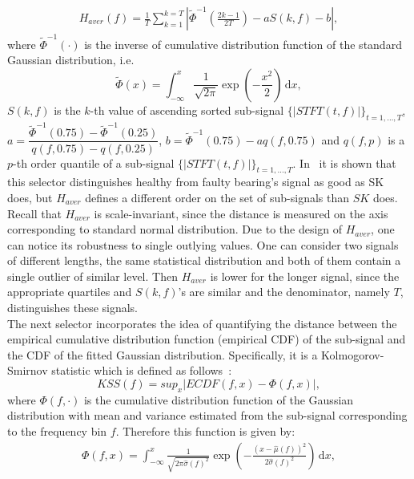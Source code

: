 \begin{eqnarray}
H_{aver}(f)=\frac{1}{T}\sum_{k=1}^{k=T}{ \left| \widetilde{\Phi}^{-1}\left(\frac{2k-1}{2T} \right) - a S(k,f)-b \right| },
\end{eqnarray}
where $\widetilde{\Phi}^{-1}(\cdot)$ is the inverse of cumulative distribution function of the standard Gaussian distribution, i.e. $$\widetilde{\Phi}(x)=\int^{x}_{-\infty} \! \frac{1}{\sqrt{2\pi}}\exp \left( -\frac{x^2}{2} \right) \, \mathrm{d} x,$$ $S(k,f)$ is the $k$-th value of ascending sorted sub-signal $\{|STFT(t,f)|\}_{t=1,\ldots,T}$, $a=\dfrac{\widetilde{\Phi}^{-1}(0.75)-\widetilde{\Phi}^{-1}(0.25)}{q(f,0.75)-q(f,0.25)}$, $b=\widetilde{\Phi}^{-1}(0.75)-aq(f,0.75)$ and $q(f,p)$ is a $p$-th order quantile of a sub-signal $\{|STFT(t,f)|\}_{t=1,\ldots,T}$. In~\cite{Obuchowski2013441} it is shown that this selector distinguishes healthy from faulty bearing's signal as good as SK does, but $H_{aver}$ defines a different order on the set of sub-signals than $SK$ does. Recall that $H_{aver}$ is scale-invariant, since the distance is measured on the axis corresponding to standard normal distribution. Due to the design of $H_{aver}$, one can notice its robustness to single outlying values. One can consider two signals of different lengths, the same statistical distribution and both of them contain a single outlier of similar level. Then $H_{aver}$ is lower for the longer signal, since the appropriate quartiles and $S(k,f)$'s are similar and the denominator, namely $T$, distinguishes these signals.\\
The next selector incorporates the idea of quantifying the distance between the empirical cumulative distribution function (empirical CDF) of the sub-signal and the CDF of the fitted Gaussian distribution. Specifically, it is a Kolmogorov-Smirnov statistic which is defined as follows~\cite{Obuchowski2014138,cordernonparametric,Justel1997251}:
\begin{equation}\label{filtering_K-S}
KSS(f)=sup_x\left|ECDF(f,x)-\Phi(f,x)\right|,
\end{equation}
where $\Phi(f,\cdot)$ is the cumulative distribution function of the Gaussian distribution with mean and variance estimated from the sub-signal corresponding to the frequency bin $f$. Therefore this function is given by:
\begin{eqnarray}\label{filtering_FF}
\Phi(f,x)=\int^{x}_{-\infty} \! \frac{1}{\sqrt{2\pi\widehat{\sigma}(f)^2}}\exp \left( -\frac{\left(x-\widehat{\mu}(f)\right)^2}{2\widehat{\sigma}(f)^2} \right) \, \mathrm{d} x,
\end{eqnarray}
